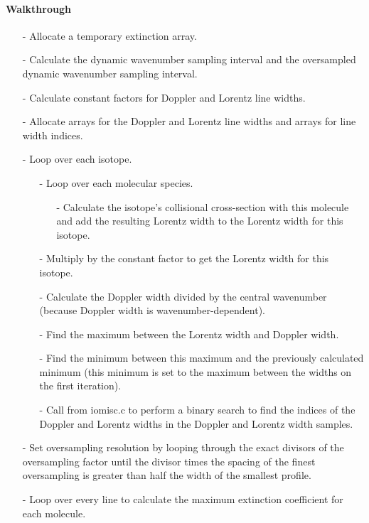 \documentclass[letterpaper,12pt]{article}
\begin{document}
\paragraph{Walkthrough}
\begin{enumerate}[leftmargin=10pt, noitemsep, parsep=0pt, topsep=0ex]
\item[-] Allocate a temporary extinction array.
\item[-] Calculate the dynamic wavenumber sampling interval and the oversampled dynamic wavenumber sampling interval.
\item[-] Calculate constant factors for Doppler and Lorentz line widths.
\item[-] Allocate arrays for the Doppler and Lorentz line widths and arrays for line width indices.
\item[-] Loop over each isotope.
\begin{enumerate}[leftmargin=10pt, noitemsep, parsep=0pt, topsep=0ex]
\item[-] Loop over each molecular species.
\begin{enumerate}[leftmargin=10pt, noitemsep, parsep=0pt, topsep=0ex]
\item[-] Calculate the isotope's collisional cross-section with this molecule and add the resulting Lorentz width to the Lorentz width for this isotope.
\end{enumerate}
\item[-] Multiply by the constant factor to get the Lorentz width for this isotope.
\item[-] Calculate the Doppler width divided by the central wavenumber (because Doppler width is wavenumber-dependent).
\item[-] Find the maximum between the Lorentz width and Doppler width.
\item[-] Find the minimum between this maximum and the previously calculated minimum (this minimum is set to the maximum between the widths on the first iteration).
\item[-] Call  from iomisc.c to perform a binary search to find the indices of the Doppler and Lorentz widths in the Doppler and Lorentz width samples.
\end{enumerate}
\item[-] Set oversampling resolution by looping through the exact divisors of the oversampling factor until the divisor times the spacing of the finest oversampling is greater than half the width of the smallest profile.
\item[-] Loop over every line to calculate the maximum extinction coefficient for each molecule.

\end{enumerate}
\end{document}
